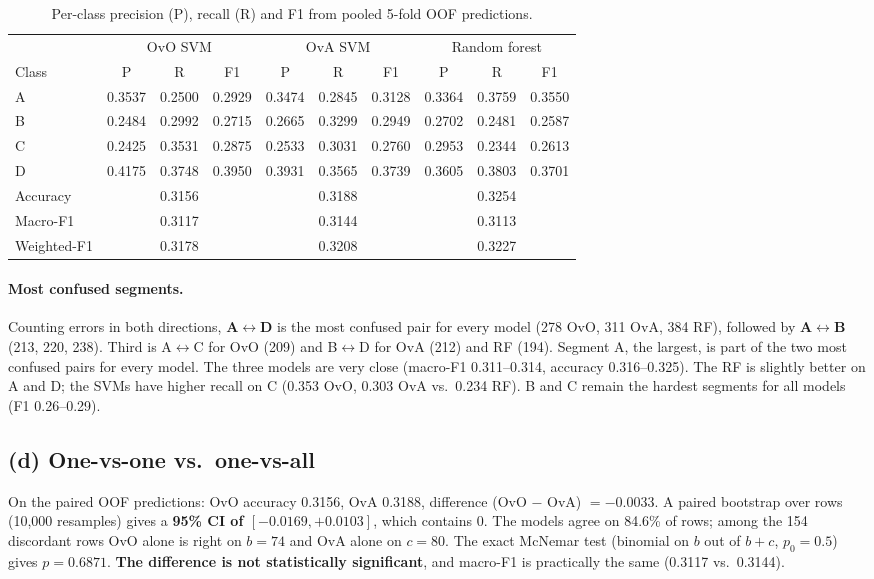 \documentclass[11pt]{article}
\begin{document}
\begin{table}[H]\centering\small
\caption{Per-class precision (P), recall (R) and F1 from pooled 5-fold OOF predictions.}\label{tab:prf}
\begin{tabular}{@{}lccccccccc@{}}
\toprule
& \multicolumn{3}{c}{OvO SVM} & \multicolumn{3}{c}{OvA SVM} & \multicolumn{3}{c}{Random forest} \\
\cmidrule(lr){2-4}\cmidrule(lr){5-7}\cmidrule(lr){8-10}
Class & P & R & F1 & P & R & F1 & P & R & F1 \\
\midrule
A & 0.3537 & 0.2500 & 0.2929 & 0.3474 & 0.2845 & 0.3128 & 0.3364 & 0.3759 & 0.3550 \\
B & 0.2484 & 0.2992 & 0.2715 & 0.2665 & 0.3299 & 0.2949 & 0.2702 & 0.2481 & 0.2587 \\
C & 0.2425 & 0.3531 & 0.2875 & 0.2533 & 0.3031 & 0.2760 & 0.2953 & 0.2344 & 0.2613 \\
D & 0.4175 & 0.3748 & 0.3950 & 0.3931 & 0.3565 & 0.3739 & 0.3605 & 0.3803 & 0.3701 \\
\midrule
Accuracy & \multicolumn{3}{c}{0.3156} & \multicolumn{3}{c}{0.3188} & \multicolumn{3}{c}{0.3254} \\
Macro-F1 & \multicolumn{3}{c}{0.3117} & \multicolumn{3}{c}{0.3144} & \multicolumn{3}{c}{0.3113} \\
Weighted-F1 & \multicolumn{3}{c}{0.3178} & \multicolumn{3}{c}{0.3208} & \multicolumn{3}{c}{0.3227} \\
\bottomrule
\end{tabular}
\end{table}

\paragraph{Most confused segments.} Counting errors in both directions, \textbf{A$\leftrightarrow$D} is the
most confused pair for every model (278 OvO, 311 OvA, 384 RF), followed by \textbf{A$\leftrightarrow$B}
(213, 220, 238). Third is A$\leftrightarrow$C for OvO (209) and B$\leftrightarrow$D for OvA (212) and
RF (194). Segment A, the largest, is part of the two most confused pairs for every model.
The three models are very close (macro-F1 0.311--0.314, accuracy 0.316--0.325). The RF is slightly
better on A and D; the SVMs have higher recall on C (0.353 OvO, 0.303 OvA vs.\ 0.234 RF). B and C
remain the hardest segments for all models (F1 0.26--0.29).

\subsection{(d) One-vs-one vs.\ one-vs-all}
On the paired OOF predictions: OvO accuracy 0.3156, OvA 0.3188, difference (OvO $-$ OvA)
$=-0.0033$. A paired bootstrap over rows (10{,}000 resamples) gives a \textbf{95\% CI of
$[-0.0169, +0.0103]$}, which contains 0. The models agree on 84.6\% of rows; among the 154 discordant
rows OvO alone is right on $b=74$ and OvA alone on $c=80$. The exact McNemar test (binomial on
$b$ out of $b+c$, $p_0=0.5$) gives \textbf{$p=0.6871$}. \textbf{The difference is not statistically
significant}, and macro-F1 is practically the same (0.3117 vs.\ 0.3144).
\end{document}
